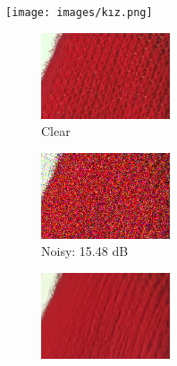  \begin{figure}[t!]
    \texttt{[image: images/kız.png]}
    \centering %
    \begin{subfigure}{0.25\textwidth}
      \includegraphics[width=\linewidth]{images/kodak_gt.png}
      \caption{Clear}
      \label{fig:kodak_clear}
    \end{subfigure}\hfil %
    \begin{subfigure}{0.25\textwidth}
      \includegraphics[width=\linewidth]{images/kodak_noisy.png}
      \caption{Noisy: 15.48 dB}
      \label{fig:kodak_noisy}
    \end{subfigure}\hfil %
    \begin{subfigure}{0.25\textwidth}
      \includegraphics[width=\linewidth]{images/kodak_out.png}

\end{subfigure}
\end{figure}
